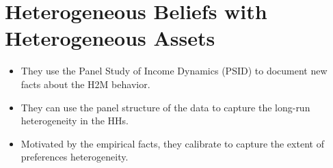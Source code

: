 \documentclass{beamer}
\begin{document}
\section{Heterogeneous Beliefs with Heterogeneous Assets}
\begin{frame}{\cite{aguiar2023hand}}
	\begin{itemize}
		\item<1-> They use the Panel Study of Income Dynamics (PSID) to document new facts about the H2M behavior.
		\item<2-> They can use the panel structure of the data to capture the long-run heterogeneity in the HHs.
		\item <3-> Motivated by the empirical facts, they calibrate \cite{kaplan2014model} to capture the extent of preferences heterogeneity. 
	\end{itemize}
\end{frame}
\end{document}
